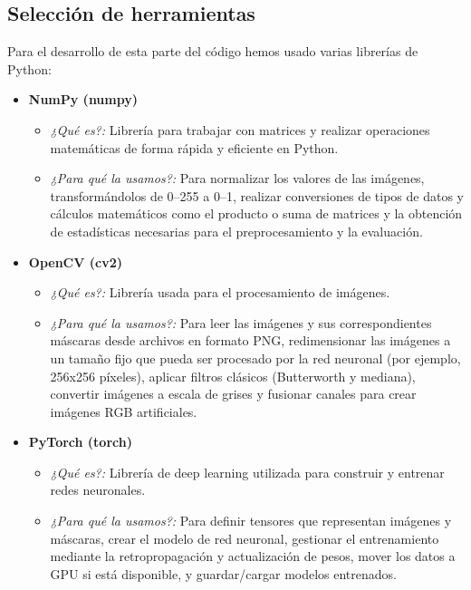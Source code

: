 \documentclass[12pt]{article}
\begin{document}
\subsection{Selección de herramientas}

Para el desarrollo de esta parte del código hemos usado varias librerías de Python:

\begin{itemize}

    \item \textbf{NumPy (numpy)} \cite{numpy}
    \begin{itemize}
        \item \textit{¿Qué es?:} Librería para trabajar con matrices y realizar operaciones matemáticas de forma rápida y eficiente en Python.
        \item \textit{¿Para qué la usamos?:} Para normalizar los valores de las imágenes, transformándolos de 0--255 a 0--1, realizar conversiones de tipos de datos y cálculos matemáticos como el producto o suma de matrices y la obtención de estadísticas necesarias para el preprocesamiento y la evaluación.
    \end{itemize}
    
    \item \textbf{OpenCV (cv2)} \cite{opencv}
    \begin{itemize}
        \item \textit{¿Qué es?:} Librería usada para el procesamiento de imágenes.
        \item \textit{¿Para qué la usamos?:} Para leer las imágenes y sus correspondientes máscaras desde archivos en formato PNG, redimensionar las imágenes a un tamaño fijo que pueda ser procesado por la red neuronal (por ejemplo, 256x256 píxeles), aplicar filtros clásicos (Butterworth y mediana), convertir imágenes a escala de grises y fusionar canales para crear imágenes RGB artificiales.
    \end{itemize}

    \item \textbf{PyTorch (torch)} \cite{pytorch}
    \begin{itemize}
        \item \textit{¿Qué es?:} Librería de deep learning utilizada para construir y entrenar redes neuronales.
        \item \textit{¿Para qué la usamos?:} Para definir tensores que representan imágenes y máscaras, crear el modelo de red neuronal, gestionar el entrenamiento mediante la retropropagación y actualización de pesos, mover los datos a GPU si está disponible, y guardar/cargar modelos entrenados.
    \end{itemize}


\end{itemize}
\end{document}
